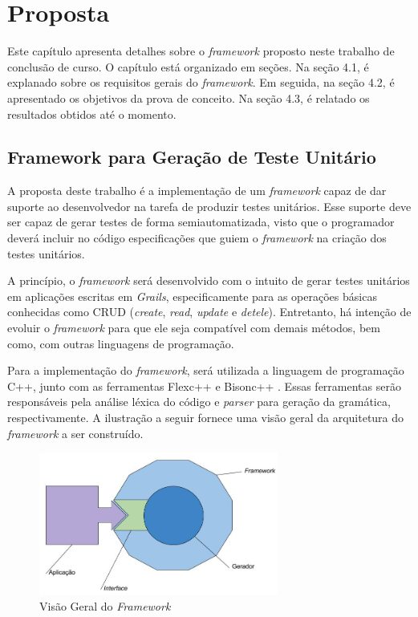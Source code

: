 \chapter[Proposta]{Proposta}
Este capítulo apresenta detalhes sobre o \textit{framework} proposto neste trabalho de conclusão de curso. O capítulo está organizado em seções. Na seção 4.1, é explanado sobre os requisitos gerais do \textit{framework}. Em seguida, na seção 4.2, é apresentado os objetivos da prova de conceito. Na seção 4.3, é relatado os resultados obtidos até o momento.

\section{Framework para Geração de Teste Unitário} \label{ch4sec1}

A proposta deste trabalho é a implementação de um \textit{framework} capaz de dar suporte ao desenvolvedor na tarefa de produzir testes unitários.  Esse suporte deve ser capaz de gerar testes de forma semiautomatizada, visto que o programador deverá incluir no código especificações que guiem o \textit{framework} na criação dos testes unitários. 
\par
\indent A princípio, o \textit{framework} será desenvolvido com o intuito de gerar testes unitários em aplicações escritas em \textit{Grails}, especificamente para as operações básicas conhecidas como CRUD (\textit{create}, \textit{read}, \textit{update} e \textit{detele}). Entretanto, há intenção de evoluir o \textit{framework} para que ele seja compatível com demais métodos, bem como, com outras linguagens de programação. 
\par
\indent Para a implementação do \textit{framework}, será utilizada a linguagem de programação C++, junto com as ferramentas Flexc++ \cite{flexcpp2015} e Bisonc++ \cite{bisoncpp2015}. Essas ferramentas serão responsáveis pela análise léxica do código e \textit{parser} para geração da gramática, respectivamente. A ilustração a seguir fornece uma visão geral da arquitetura do \textit{framework} a  ser construído.
 
 \begin{figure}[h]
    \centering
    \includegraphics[width=0.7\textwidth]{figuras/estruturaarquitetural.jpg}
    \caption{Visão Geral do \textit{Framework}}
    \label{fig:estruturaarquitetural}
 \end{figure}


